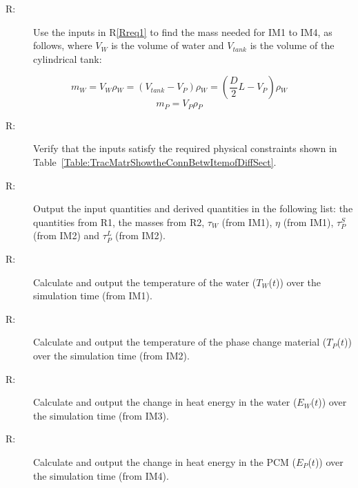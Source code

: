 \documentclass[12pt]{article}
\newcounter{reqnum}
\newcommand{\rthereqnum}{R\thereqnum}
\begin{document}
\begin{description}
\item[\rthereqnum\label{Rreq2}:]Use the inputs in R\ref{Rreq1} to find the mass needed for IM1 to IM4, as follows, where $V_{W}$ is the volume of water and $V_{tank}$ is the volume of the cylindrical tank:
\end{description}
\begin{equation}
m_{W}=V_{W}\rho{}_{W}=\left(V_{tank}-V_{P}\right)\rho{}_{W}=\left(\frac{D}{2}L-V_{P}\right)\rho{}_{W}
\end{equation}
\begin{equation}
m_{P}=V_{P}\rho{}_{P}
\end{equation}
\begin{description}
\item[\rthereqnum\label{Rreq3}:]Verify that the inputs satisfy the required physical constraints shown in Table~\ref{Table:TracMatrShowtheConnBetwItemofDiffSect}.
\end{description}
\begin{description}
\item[\rthereqnum\label{Rreq4}:]Output the input quantities and derived quantities in the following list: the quantities from R1, the masses from R2, $\tau{}_{W}$ (from IM1), $\eta{}$ (from IM1), $\tau{}_{P}^{S}$ (from IM2) and $\tau{}_{P}^{L}$ (from IM2).
\end{description}
\begin{description}
\item[\rthereqnum\label{Rreq5}:]Calculate and output the temperature of the water ($T_{W}$($t$)) over the simulation time (from IM1).
\end{description}
\begin{description}
\item[\rthereqnum\label{Rreq6}:]Calculate and output the temperature of the phase change material ($T_{P}$($t$)) over the simulation time (from IM2).
\end{description}
\begin{description}
\item[\rthereqnum\label{Rreq7}:]Calculate and output the change in heat energy in the water ($E_{W}$($t$)) over the simulation time (from IM3).
\end{description}
\begin{description}
\item[\rthereqnum\label{Rreq8}:]Calculate and output the change in heat energy in the PCM ($E_{P}$($t$)) over the simulation time (from IM4).
\end{description}
\end{document}
